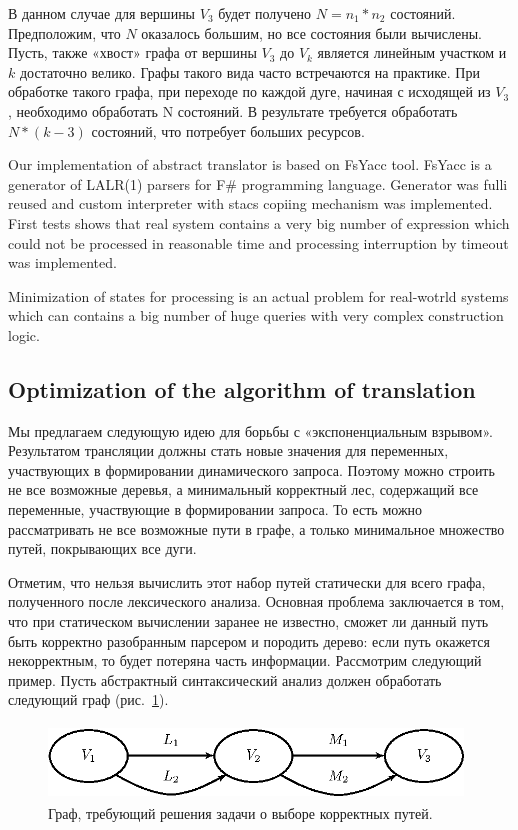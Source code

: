 \documentclass{llncs}
\begin{document}
В данном случае для вершины $V_3$ будет получено $N = n_1*n_2$ состояний. Предположим, что $N$ оказалось большим, но все состояния были вычислены. Пусть, также «хвост» графа от вершины $V_3$ до $V_k$ является линейным участком и $k$ достаточно велико. Графы такого вида часто встречаются на практике. При обработке такого графа, при переходе по каждой дуге, начиная с исходящей из $V_3$, необходимо обработать N состояний. В результате требуется обработать $N*(k-3)$ состояний, что потребует больших ресурсов.

Our implementation of abstract translator is based on FsYacc tool. FsYacc is a generator of LALR(1) parsers for F\# programming language. Generator was fulli reused and custom interpreter with stacs copiing mechanism was implemented. First tests shows that real system contains a very big number of expression which could not be processed in reasonable time and processing interruption by timeout was implemented. 

Minimization of states for processing is an actual problem for real-wotrld systems which can contains a big number of huge queries with very complex construction logic.

\subsection{Optimization of the algorithm of translation}

Мы предлагаем следующую идею для борьбы с «экспоненциальным взрывом». Результатом трансляции должны стать новые значения для переменных, участвующих в формировании динамического запроса. Поэтому можно строить не все возможные деревья, а минимальный корректный лес, содержащий все переменные, участвующие в формировании запроса. То есть можно рассматривать не все возможные пути в графе, а только минимальное множество путей, покрывающих все дуги.

Отметим, что нельзя вычислить этот набор путей статически для всего графа, полученного после лексического анализа. Основная проблема заключается в том, что при статическом вычислении заранее не известно, сможет ли данный путь быть корректно разобранным парсером и породить дерево: если путь окажется некорректным, то будет потеряна часть информации.
Рассмотрим следующий пример. Пусть абстрактный синтаксический анализ должен обработать следующий граф (рис.~\ref{pic6}).


\begin{figure}
    \begin{center}
        \includegraphics[width=11cm,height=2cm]{graphs/paths.eps}
        \caption{Граф, требующий решения задачи о выборе корректных путей.}
        \label{pic6}
    \end{center}
\end{figure}
\end{document}
